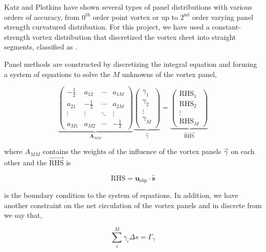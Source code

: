 Katz and Plotkins have shown several types of panel distributions with various orders of accuracy, from $0^{\mathrm{th}}$
order point vortex or up to $2^{\mathrm{nd}}$ order varying panel strength curvatured distribution. For this project, we have used a constant-strength vortex distribution that discretized the vortex sheet into straight segments, classified as .

Panel methods are constructed by discretizing the integral equation and forming a system of equations to solve the $M$ unknowns of the vortex panel,

	\begin{equation}
	\underbrace{\begin{pmatrix}
	-\frac{1}{2} & a_{12} & \cdots & a_{1M}\\ 
	a_{21} & -\frac{1}{2} & \cdots & a_{2M}\\
	\vdots & \vdots & \ddots & \vdots\\ 
	a_{M1} & a_{M2} & \cdots & -\frac{1}{2}
	\end{pmatrix}}_{\mathbf{A}_{MM}} \underbrace{\begin{pmatrix}
	\gamma_{1}\\ \gamma_{2}\\
	\vdots\\
	\gamma_M\\
	\end{pmatrix}}_{\vec{\gamma}} = \underbrace{\begin{pmatrix}
	\mathrm{RHS}_1\\ 
	\mathrm{RHS}_2\\ 
	\vdots\\
	\mathrm{RHS}_M
	\end{pmatrix}}_{\overrightarrow{\mathrm{RHS}}}
	\label{eq:vortexSheetSystemofEquations}
	\end{equation}


where $A_{MM}$ contains the weights of the influence of the vortex panels $\vec{\gamma}$ on each other and the $\overrightarrow{\mathrm{RHS}}$ is

	\begin{equation}
	\mathrm{RHS} = \mathbf{u}_{\mathrm{slip}}\cdot\mathbf{\hat{s}}
	\end{equation}
	
is the boundary condition to the system of equations. In addition, we have another constraint on the net circulation of the vortex panels and in discrete from we say that,

	\begin{equation}
	\sum_{i}^{M} \gamma_i\Delta s = \Gamma_{\gamma}
	\end{equation}	

